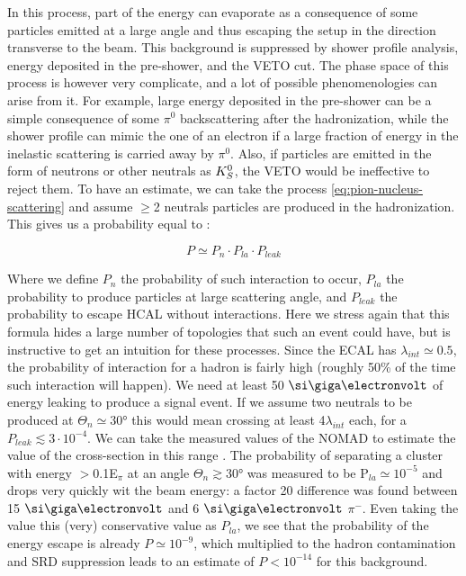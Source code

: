In this process, part of the energy can evaporate as a consequence of some particles emitted at a large angle and thus escaping the setup in the direction transverse to the beam. This background is suppressed by shower profile analysis, energy deposited in the pre-shower, and the VETO cut. The phase space of this process is however very complicate, and a lot of possible phenomenologies can arise from it. For example, large energy deposited in the pre-shower can be a simple consequence of some $\pi^0$ backscattering after the hadronization, while the shower profile can mimic the one of an electron if a large fraction of energy in the inelastic scattering is carried away by $\pi^0$. Also, if particles are emitted in the form of neutrons or other neutrals as $K^0_S$, the VETO would be ineffective to reject them. To have an estimate, we can take the process \ref{eq:pion-nucleus-scattering} and assume $\geq$2 neutrals particles are produced in the hadronization. This gives us a probability equal to \cite{gkkk1}:

\begin{equation}
  \label{eq:transverse-leak-estimate}
  P \simeq P_n \cdot P_{la} \cdot P_{leak}
\end{equation}

Where we define $P_n$ the probability of such interaction to occur, $P_{la}$ the probability to produce particles at large scattering angle, and $P_{leak}$ the probability to escape HCAL without interactions. Here we stress again that this formula hides a large number of topologies that such an event could have, but is instructive to get an intuition for these processes. Since the ECAL has $\lambda_{int} \simeq 0.5$, the probability of interaction for a hadron is fairly high (roughly 50\% of the time such interaction will happen). We need at least 50 $\gev$ of energy leaking to produce a signal event. If we assume two neutrals to be produced at $\Theta_{n} \simeq 30$\si{\degree} this would mean crossing at least 4$\lambda_{int}$ each, for a $P_{leak} \lesssim 3 \cdot 10^{-4}$. We can take the measured values of the NOMAD to estimate the value of the cross-section in this range \cite{AUTIERO1998285,GNINENKO1998583}. The probability of separating a cluster with energy $>$0.1E$_{\pi}$ at an angle $\Theta_{n} \gtrsim 30$\si{\degree} was measured to be P$_{la} \simeq 10^{-5}$ and drops very quickly wit the beam energy: a factor 20 difference was found between 15 $\gev$ and 6 $\gev$ $\pi^-$. Even taking the value this (very) conservative value as $P_{la}$, we see that the probability of the energy escape is already $P\simeq 10^{-9}$, which multiplied to the hadron contamination and SRD suppression leads to an estimate of $P<10^{-14}$ for this background.

